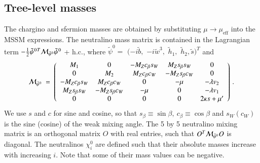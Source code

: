 \documentclass[final,3p,times]{elsarticle}
\begin{document}
\subsection{Tree-level masses \label{sec:tree}}
The chargino and sfermion masses are obtained by substituting 
$\mu\to\mu_\textrm{eff}$ into the MSSM expressions. The neutralino mass matrix 
is contained in the Lagrangian term  
$-\frac{1}{2}{\tilde\psi^0}{}^T{\cal M}_{\tilde\psi^0}\tilde\psi^0$ + h.c., where 
$\tilde\psi^0 =$ $(-i\tilde b,$ 
$-i\tilde w^3,$ $\tilde h_1,$ $\tilde h_2, \tilde{s})^T$ and
%
\begin{equation}
{\cal M}_{\tilde\psi^0} \ =\ \left(\begin{array}{ccccc} 
M_1 & 0 &-M_Zc_\beta s_W & M_Zs_\beta s_W & 0 \\
 0 & M_2 & M_Zc_\beta c_W & -M_Zs_\beta c_W & 0 \\ 
-M_Zc_\beta s_W & M_Zc_\beta c_W & 0 & -\mu & -\lambda v_2 \\
M_Zs_\beta s_W & -M_Zs_\beta c_W & -\mu & 0 & - \lambda v_1 \\
0 & 0 & 0 & 0 & 2 \kappa s + \mu^\prime
\end{array} \right)\,. \label{mchi0}
\end{equation} 
We use $s$ and $c$ for sine and cosine, so that
$s_\beta\equiv\sin\beta,\ c_{\beta}\equiv\cos\beta$ and $s_W (c_W)$ is
the sine (cosine) of the weak mixing angle.  
The 5 by 5 neutralino mixing matrix is an orthogonal matrix $O$ with real 
entries, such that $O^T {\cal M}_{\tilde\psi^0} O$ is diagonal. The neutralinos 
$\chi^0_i$ are defined such that their absolute masses increase with increasing 
$i$. Note that some of their mass values can be negative. 
\end{document}
